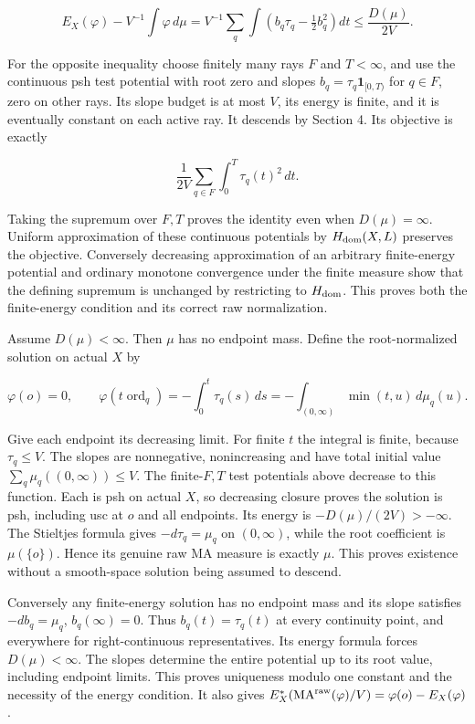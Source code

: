 \documentclass[11pt]{article}
\begin{document}
\[
 E_X(\varphi)-V^{-1}\int\varphi\,d\mu
 =V^{-1}\sum_q\int\left(b_q\tau_q-\tfrac12 b_q^2\right)dt
 \leq\frac{D(\mu)}{2V}.
\]

For the opposite inequality choose finitely many rays $F$ and $T<\infty$, and use the continuous psh test potential with root zero and slopes $b_q=\tau_q\mathbf1_{[0,T)}$ for $q\in F$, zero on other rays. Its slope budget is at most $V$, its energy is finite, and it is eventually constant on each active ray. It descends by Section 4. Its objective is exactly

\[
 \frac1{2V}\sum_{q\in F}\int_0^T\tau_q(t)^2\,dt.
\]

Taking the supremum over $F,T$ proves the identity even when $D(\mu)=\infty$. Uniform approximation of these continuous potentials by $H_{\rm dom}(X,L)$ preserves the objective. Conversely decreasing approximation of an arbitrary finite-energy potential and ordinary monotone convergence under the finite measure show that the defining supremum is unchanged by restricting to $H_{\rm dom}$. This proves both the finite-energy condition and its correct raw normalization.

Assume $D(\mu)<\infty$. Then $\mu$ has no endpoint mass. Define the root-normalized solution on actual $X$ by

\[
 \varphi(o)=0,\qquad
 \varphi(t\operatorname{ord}_q)
 =-\int_0^t\tau_q(s)\,ds
 =-\int_{(0,\infty)}\min(t,u)\,d\mu_q(u).
\]

Give each endpoint its decreasing limit. For finite $t$ the integral is finite, because $\tau_q\leq V$. The slopes are nonnegative, nonincreasing and have total initial value $\sum_q\mu_q((0,\infty))\leq V$. The finite-$F,T$ test potentials above decrease to this function. Each is psh on actual $X$, so decreasing closure proves the solution is psh, including usc at $o$ and all endpoints. Its energy is $-D(\mu)/(2V)>-\infty$. The Stieltjes formula gives $-d\tau_q=\mu_q$ on $(0,\infty)$, while the root coefficient is $\mu(\{o\})$. Hence its genuine raw MA measure is exactly $\mu$. This proves existence without a smooth-space solution being assumed to descend.

Conversely any finite-energy solution has no endpoint mass and its slope satisfies $-db_q=\mu_q$, $b_q(\infty)=0$. Thus $b_q(t)=\tau_q(t)$ at every continuity point, and everywhere for right-continuous representatives. Its energy formula forces $D(\mu)<\infty$. The slopes determine the entire potential up to its root value, including endpoint limits. This proves uniqueness modulo one constant and the necessity of the energy condition. It also gives $E_X^*(\mathrm{MA}^{\rm raw}(\varphi)/V)=\varphi(o)-E_X(\varphi)$.
\end{document}
